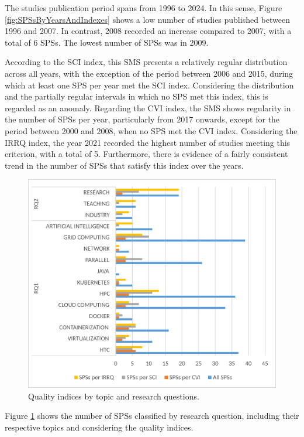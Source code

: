 The studies publication period spans from 1996 to 2024. In this sense, Figure \ref{fig:SPSsByYearsAndIndexes} shows a low number of studies published between 1996 and 2007. In contrast, 2008 recorded an increase compared to 2007, with a total of 6 SPSs. The lowest number of SPSs was in 2009.

According to the SCI index, this SMS presents a relatively regular distribution across all years, with the exception of the period between 2006 and 2015, during which at least one SPS per year met the SCI index. Considering the distribution and the partially regular intervals in which no SPS met this index, this is regarded as an anomaly. Regarding the CVI index, the SMS shows regularity in the number of SPSs per year, particularly from 2017 onwards, except for the period between 2000 and 2008, when no SPS met the CVI index. Considering the IRRQ index, the year 2021 recorded the highest number of studies meeting this criterion, with a total of 5. Furthermore, there is evidence of a fairly consistent trend in the number of SPSs that satisfy this index over the years.

\begin{figure}[ht]
	\centering
	\includegraphics[scale=0.179]{resources/figures/Imagen5.eps}
	\caption{Quality indices by topic and research questions.}
	\label{fig:IndexesByTopicAndRQs}
\end{figure}

Figure \ref{fig:IndexesByTopicAndRQs} shows the number of SPSs classified by research question, including their respective topics and considering the quality indices.

